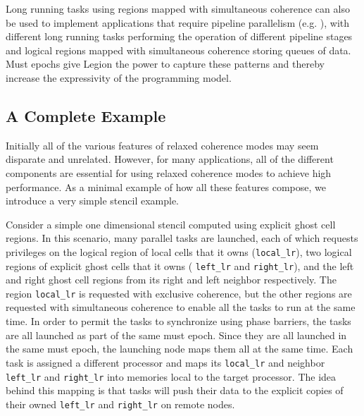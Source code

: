 Long running tasks using regions mapped with
simultaneous coherence can also be used to 
implement applications that require pipeline
parallelism (e.g. \cite{GRAMPS09}), with 
different long running tasks performing the 
operation of different pipeline stages and 
logical regions mapped with simultaneous 
coherence storing queues of data. Must 
epochs give Legion the power to capture 
these patterns and thereby increase the 
expressivity of the programming model.

\subsection{A Complete Example}
\label{sec:completeex}
Initially all of the various features of relaxed
coherence modes may seem disparate and unrelated.
However, for many applications, all of the different
components are essential for using relaxed coherence
modes to achieve high performance. As a minimal 
example of how all these features compose, we 
introduce a very simple stencil example.

Consider a simple one dimensional stencil computed
using explicit ghost cell regions. In this scenario,
many parallel tasks are launched, each of which
requests privileges on the logical region of local
cells that it owns ({\tt local\_lr}), two logical 
regions of explicit ghost cells that it owns (
{\tt left\_lr} and {\tt right\_lr}), and the 
left and right ghost cell regions from its right
and left neighbor respectively. The region {\tt local\_lr}
is requested  with exclusive coherence, but the 
other regions are requested with simultaneous coherence
to enable all the tasks to run at the same time.
In order to permit the tasks to synchronize using
phase barriers, the tasks are all launched as part
of the same must epoch. Since they are all launched
in the same must epoch, the launching node
maps them all at the same time. Each task is assigned
a different processor and maps its {\tt local\_lr}
and neighbor {\tt left\_lr} and {\tt right\_lr} into
memories local to the target processor. The idea behind
this mapping is that tasks will push their data to 
the explicit copies of their owned {\tt left\_lr} 
and {\tt right\_lr} on remote nodes.

